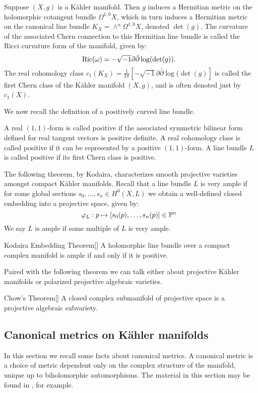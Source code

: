 \begin{example}
Suppose \((X,g)\) is a K\"ahler manifold. Then \(g\) induces a Hermitian metric on the holomorphic cotangent bundle \(\Omega^{1,0} X\), which in turn induces a Hermitian metric on the canonical line bundle \(K_X = \wedge^{n} \Omega^{1,0} X\), denoted \(\det(g)\). The curvature of the associated Chern connection to this Hermitian line bundle is called the Ricci curvature form of the manifold, given by:
\[
\mathop{\rm Ric}\nolimits(\omega) = - \sqrt{-1} \partial \bar{\partial} \log( \det(g) ).
\]
The real cohomology class \(c_1(K_X) = \frac{1}{2 \pi} [  - \sqrt{-1} \partial \bar{\partial} \log( \det(g) ]  \) is called the first Chern class of the K\"ahler manifold \((X,g)\), and is often denoted just by \(c_1(X)\).
\end{example}
We now recall the definition of a positively curved line bundle.
\begin{definition}
A real \((1,1)\)-form is called positive if the associated symmetric bilinear form defined for real tangent vectors is positive definite. A real cohomology class is called positive if it can be represented by a positive \((1,1)\)-form. A line bundle \(L\) is called positive if its first Chern class is positive.
\end{definition}
The following theorem, by Kodaira, characterizes smooth projective varieties amongst compact K\"ahler manifolds. Recall that a line bundle \(L\) is very ample if for some global sections \(s_0,\dots,s_n \in H^0(X,L)\) we obtain a well-defined closed embedding into a projective space, given by:
\[
\varphi_L: p \mapsto [s_0(p),\dots,s_n(p)] \in \mathbb{P}^n
\]
We say \(L\) is ample if some multiple of \(L\) is very ample.
\begin{namedthm}{Kodaira Embedding Theorem}[{\cite[Theorem 4]{kodaira1954kahler}}]
A holomorphic line bundle over a compact complex manifold is ample if and only if it is positive.
\end{namedthm}
Paired with the following theorem we can talk either about projective K\"ahler manifolds or polarized projective algebraic varieties.
\begin{namedthm}{Chow's Theorem}[{\cite[Theorem 5]{chow1949compact}}]
A closed complex submanifold of projective space is a projective algebraic subvariety.
\end{namedthm}
\subsection{Canonical metrics on K\"ahler manifolds} \label{sec:canonmetric}
In this section we recall some facts about canonical metrics. A canonical metric is a choice of metric dependent only on the complex structure of the manifold, unique up to biholomorphic automorphisms. The material in this section may be found in \cite{szebook}, for example.

